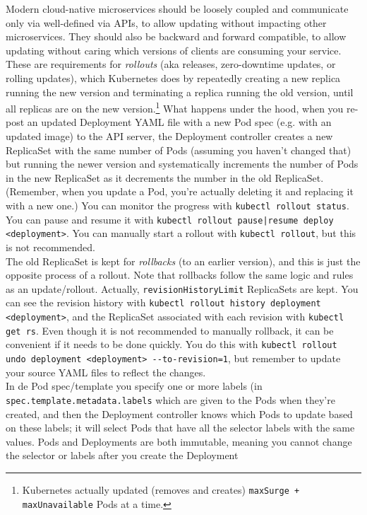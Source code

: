 \documentclass[8pt, table, xcdraw]{article}%
\begin{document}
Modern cloud-native microservices should be loosely coupled and communicate only via well-defined via APIs, to allow updating without impacting other microservices. They should also be backward and forward compatible, to allow updating without caring which versions of clients are consuming your service. These are requirements for \emph{rollouts} (aka releases, zero-downtime updates, or rolling updates), which Kubernetes does by repeatedly creating a new replica running the new version and terminating a replica running the old version, until all replicas are on the new version.\footnote{Kubernetes actually updated (removes and creates) \lstinline{maxSurge + maxUnavailable} Pods at a time.} What happens under the hood, when you re-post an updated Deployment YAML file with a new Pod spec (e.g. with an updated image) to the API server, the Deployment controller creates a new ReplicaSet with the same number of Pods (assuming you haven't changed that) but running the newer version and systematically increments the number of Pods in the new ReplicaSet as it decrements the number in the old ReplicaSet. (Remember, when you update a Pod, you’re actually deleting it and replacing it with a new one.) You can monitor the progress with \lstinline{kubectl rollout status}. You can pause and resume it with \lstinline{kubectl rollout pause|resume deploy <deployment>}. You can manually start a rollout with \lstinline{kubectl rollout}, but this is not recommended.\\
The old ReplicaSet is kept for \emph{rollbacks} (to an earlier version), and this is just the opposite process of a rollout. Note that rollbacks follow the same logic and rules as an update/rollout. Actually, \lstinline{revisionHistoryLimit} ReplicaSets are kept. You can see the revision history with \lstinline{kubectl rollout history deployment <deployment>}, and the ReplicaSet associated with each revision with \lstinline{kubectl get rs}. Even though it is not recommended to manually rollback, it can be convenient if it needs to be done quickly. You do this with \lstinline{kubectl rollout undo deployment <deployment> --to-revision=1}, but remember to update your source YAML files to reflect the changes.\\
In de Pod spec/template you specify one or more labels (in \lstinline{spec.template.metadata.labels} which are given to the Pods when they're created, and then the Deployment controller knows which Pods to update based on these labels; it will select Pods that have all the selector labels with the same values. Pods and Deployments are both immutable, meaning you cannot change the selector or labels after you create the Deployment
\end{document}
